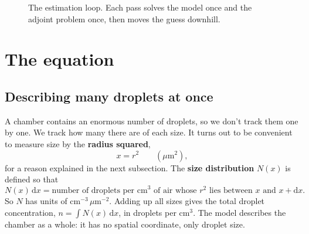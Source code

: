 \documentclass[11pt]{article}
\newcommand{\J}{\mathcal{J}}
\newcommand{\dd}{\mathrm{d}}
\begin{document}
\begin{figure}[h]
\centering
{}
\caption{The estimation loop. Each pass solves the model once and the adjoint problem once, then moves the guess downhill.}\label{fig:pipeline}
\end{figure}

\section{The equation}\label{sec:equation}
\subsection{Describing many droplets at once}
A chamber contains an enormous number of droplets, so we don't track them one by one. We track how many there are of each size. It turns out to be convenient to measure size by the \textbf{radius squared},
\[
x = r^2 \qquad (\mu\mathrm{m}^2),
\]
for a reason explained in the next subsection. The \textbf{size distribution} $N(x)$ is defined so that
\[
N(x)\,\dd x = \text{number of droplets per cm}^3 \text{ of air whose } r^2 \text{ lies between } x \text{ and } x+\dd x .
\]
So $N$ has units of cm$^{-3}\,\mu$m$^{-2}$. Adding up all sizes gives the total droplet concentration, $n = \int N(x)\,\dd x$, in droplets per cm$^3$. The model describes the chamber as a whole: it has no spatial coordinate, only droplet size.
\end{document}
